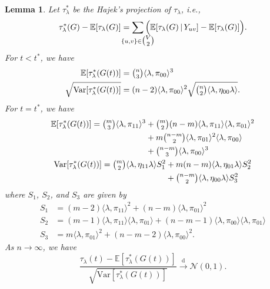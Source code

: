 \documentclass[10pt,draftclsnofoot,onecolumn]{IEEEtran}
\newtheorem{lemma}[theorem]{Lemma}
\theoremstyle{definition}
\def\clap#1{\hbox to 0pt{\hss#1\hss}}
\def\mathclap{\mathpalette\mathclapinternal}
\def\mathclapinternal#1#2{%
\clap{$\mathsurround=0pt#1{#2}$}%
}
\begin{document}
\begin{lemma}
  \label{lem:3}
  Let $\tau_{\lambda}^{*}$ be the Hajek's projection of $\tau_{\lambda}$, i.e.,
\begin{equation}
  \label{eq:46}
  \tau_{\lambda}^{*}(G) - \mathbb{E}[\tau_{\lambda}(G)] =
  \sum_{\mathclap{\{u,v\} \in \tbinom{V}{2}}} \, \Bigl(\mathbb{E}[
  \tau_{\lambda}(G) \, \lvert \, Y_{uv}] -
  \mathbb{E}[\tau_{\lambda}(G)]\Bigr).
\end{equation}
For $t < t^{*}$, we have
\begin{align*}
  \mathbb{E}[\tau_{\lambda}^{*}(G(t))] &= \tbinom{n}{3} \langle 
  \lambda, \pi_{00} \rangle^{3} \\
  \sqrt{\mathrm{Var}[\tau_{\lambda}^{*}(G(t))]} &= (n-2) \langle \lambda,
  \pi_{00} \rangle^{2} \sqrt{\tbinom{n}{2} \langle \lambda, \eta_{00}
  \lambda \rangle}.
\end{align*}
For $t = t^{*}$, we have
  \begin{gather*}
    \label{eq:42}
    \begin{split}
    \mathbb{E}[\tau_{\lambda}^{*}(G(t))] = \tbinom{m}{3}
    \langle \lambda, \pi_{11} \rangle^{3} &+
    \tbinom{m}{2}(n-m) \langle \lambda, \pi_{11} \rangle \langle
    \lambda, \pi_{01} \rangle^{2} \\ &+ m \tbinom{n-m}{2} \langle \lambda,
    \pi_{01} \rangle^{2} \langle \lambda, \pi_{00} \rangle \\ &+
    \tbinom{n-m}{3} \langle \lambda, \pi_{00} \rangle^{3}
    \end{split} \\
    \begin{split}
    \mathrm{Var}[\tau_{\lambda}^{*}(G(t))] = \tbinom{m}{2} \langle \lambda, \eta_{11} \lambda
    \rangle S_1^2  
    &+ m(n-m) \langle \lambda, \eta_{01} \lambda \rangle S_2^2  \\
    &+ \tbinom{n-m}{2} \langle \lambda, \eta_{00} \lambda \rangle
    S_3^2
    \end{split}
  \end{gather*}
  where $S_1$, $S_2$, and $S_3$ are given by
\begin{align*}
    S_1 &= (m-2) \langle \lambda, \pi_{11} \rangle^{2} + (n-m)
    \langle \lambda, \pi_{01} \rangle^{2} \\ 
    S_2 &= (m-1)
    \langle \lambda, \pi_{11} \rangle \langle \lambda, \pi_{01}
    \rangle + (n-m-1) \langle \lambda, \pi_{00} \rangle \langle
    \lambda, \pi_{01} \rangle \\
    S_3 &= m \langle \lambda, \pi_{01} \rangle^{2} + (n-m-2) \langle
    \lambda, \pi_{00} \rangle^{2}.
    \end{align*}
  As $n \rightarrow \infty$, we have
  \begin{equation}
    \label{eq:49}
    \frac{\tau_{\lambda}(t) -
      \mathbb{E}[\tau_{\lambda}^{*}(G(t))]}{\sqrt{\mathrm{Var}[\tau_{\lambda}^{*}(G(t))]}}
\overset{\mathrm{d}}{\longrightarrow}  \mathcal{N}(0,1).
  \end{equation}
\end{lemma}
\end{document}
